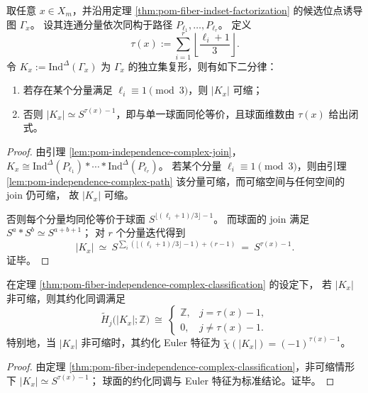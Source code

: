 \begin{theorem}\label{thm:pom-fiber-independence-complex-classification}
取任意 \(x\in X_m\)，并沿用定理 \ref{thm:pom-fiber-indset-factorization} 的候选位点诱导图
\(\Gamma_x\)。
设其连通分量依次同构于路径 \(P_{\ell_1},\dots,P_{\ell_r}\)。
定义
\[
\tau(x):=\sum_{i=1}^r \left\lfloor\frac{\ell_i+1}{3}\right\rfloor.
\]
令
\(
K_x:=\mathrm{Ind}^{\Delta}(\Gamma_x)
\)
为 \(\Gamma_x\) 的独立集复形，则有如下二分律：
\begin{enumerate}
  \item 若存在某个分量满足 \(\ell_i\equiv 1\pmod 3\)，则 \(|K_x|\) 可缩；
  \item 否则 \(|K_x|\simeq S^{\tau(x)-1}\)，即与单一球面同伦等价，且球面维数由 \(\tau(x)\) 给出闭式。
\end{enumerate}
\end{theorem}
\begin{proof}
由引理 \ref{lem:pom-independence-complex-join}，
\(
K_x\cong \mathrm{Ind}^{\Delta}(P_{\ell_1})\ast\cdots\ast \mathrm{Ind}^{\Delta}(P_{\ell_r})
\)。
若某个分量 \(\ell_i\equiv 1\pmod 3\)，则由引理 \ref{lem:pom-independence-complex-path} 该分量可缩，而可缩空间与任何空间的 join 仍可缩，
故 \(|K_x|\) 可缩。
\par
否则每个分量均同伦等价于球面 \(S^{\lfloor(\ell_i+1)/3\rfloor-1}\)。
而球面的 join 满足
\(
S^{a}\ast S^{b}\simeq S^{a+b+1}
\)；
对 \(r\) 个分量迭代得到
\[
|K_x|\ \simeq\ S^{\sum_i(\lfloor(\ell_i+1)/3\rfloor-1)+(r-1)}
\ =\ S^{\tau(x)-1}.
\]
证毕。
\end{proof}

\begin{corollary}\label{cor:pom-fiber-independence-complex-homology}
在定理 \ref{thm:pom-fiber-independence-complex-classification} 的设定下，
若 \(|K_x|\) 非可缩，则其约化同调满足
\[
\widetilde H_j\bigl(|K_x|;\mathbb Z\bigr)\ \cong\
\begin{cases}
\mathbb Z,& j=\tau(x)-1,\\
0,& j\neq \tau(x)-1.
\end{cases}
\]
特别地，当 \(|K_x|\) 非可缩时，其约化 Euler 特征为 \(\widetilde\chi(|K_x|)=(-1)^{\tau(x)-1}\)。
\end{corollary}
\begin{proof}
由定理 \ref{thm:pom-fiber-independence-complex-classification}，非可缩情形下 \(|K_x|\simeq S^{\tau(x)-1}\)；
球面的约化同调与 Euler 特征为标准结论。证毕。
\end{proof}

